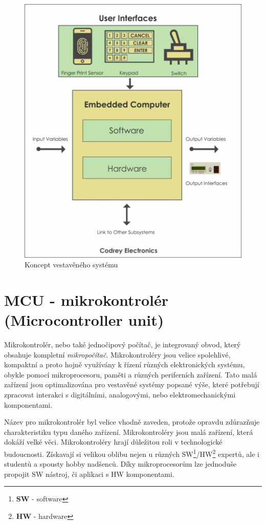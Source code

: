 \begin{figure}[hbt]
  \centering
  \includegraphics[width=.6 \linewidth]{obrazky-figures/embedded_system.png}
  \caption{
    Koncept vestavěného systému
  }
  \label{figure:embedded}
\end{figure}

\newpage
\section{MCU - mikrokontrolér (Microcontroller unit)}
\label{terminy:mcu}

Mikrokontrolér, nebo také jednočipový počítač, je integrovaný obvod, který obsahuje kompletní \emph{mikropočítač}.
Mikrokontroléry jsou velice spolehlivé, kompaktní a proto hojně využívány k řízení různých elektronických systému, obykle pomocí mikroprocesoru, paměti a různých periferních zařízení.
Tato malá zařízení jsou optimalizována pro vestavěné systémy popsané výše, které potřebují zpracovat interakci s digitálními, analogovými, nebo elektromechanickými komponentami.

Název pro mikrokontrolér byl velice vhodně zaveden, protože opravdu zdůrazňuje charakteristiku typu daného zařízení. Mikrokontroléry jsou malá zařízení, která dokáží velké věci.
Mikrokontroléry hrají důležitou roli v technologické budoucnosti. Získavají si velikou oblibu nejen u různých SW\footnote{\textbf{SW} - software}/HW\footnote{\textbf{HW} - hardware} expertů, ale i studentů a spousty hobby nadšenců.\cite{mcu:info}
Díky mikroprocesorům lze jednoduše propojit SW nástroj, či aplikaci s HW komponentami.

